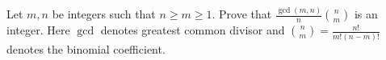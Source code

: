 Let $m, n$ be integers such that $n \ge m \ge 1$. Prove that $\displaystyle
\frac{\gcd(m, n)}{n} \binom{n}{m}$ is an integer. Here $\gcd$ denotes greatest
common divisor and $\displaystyle \binom{n}{m} = \frac{n!}{m!(n-m)!}$
denotes the binomial coefficient.
